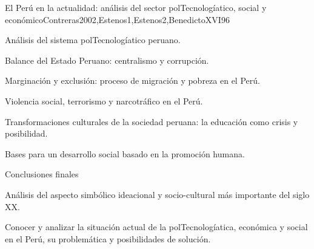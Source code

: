 \begin{syllabus}
\begin{unit}{El Perú en la actualidad: análisis del sector polTecnologíatico, social y económico}{Contreras2002,Estenos1,Estenos2,BenedictoXVI}{9}{6}
\begin{topics}
	\item Análisis del sistema polTecnologíatico peruano.
	\item Balance del Estado Peruano: centralismo y corrupción.
	\item Marginación y exclusión: proceso de migración y pobreza en el Perú.
	\item Violencia social, terrorismo y narcotráfico en el Perú.
	\item Transformaciones culturales de la sociedad peruana: la educación como crisis y posibilidad.
	\item Bases para un desarrollo social basado en la promoción  humana.
	\item Conclusiones finales

	\item Análisis del aspecto simbólico ideacional y socio-cultural más importante del siglo XX. 

\end{topics}
\begin{learningoutcomes}
	\item Conocer y analizar la situación actual de la polTecnologíatica, económica y social en el Perú, su problemática y posibilidades de solución.
\end{learningoutcomes}
\end{unit}



\begin{coursebibliography}
\end{coursebibliography}
\end{syllabus}
